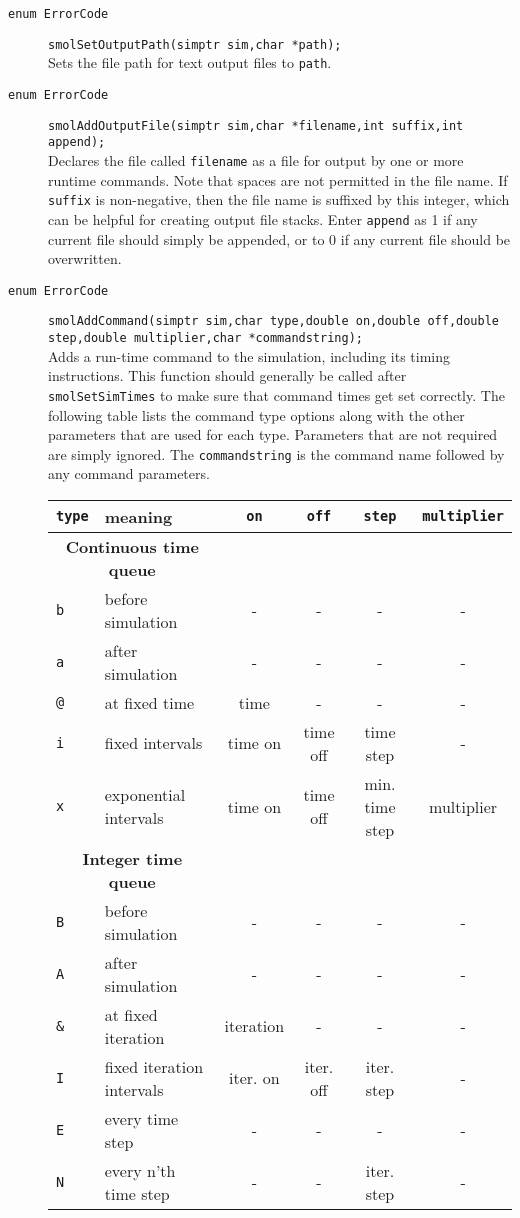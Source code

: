 \documentclass {book}
\begin{document}
\begin{description}

\item[\texttt{enum ErrorCode}]
\texttt{smolSetOutputPath(simptr sim,char *path);}
\hfill \\
Sets the file path for text output files to \texttt{path}.

\item[\texttt{enum ErrorCode}]
\texttt{smolAddOutputFile(simptr sim,char *filename,int suffix,int append);}
\hfill \\
Declares the file called \texttt{filename} as a file for output by one or more runtime commands.  Note that spaces are not permitted in the file name.  If \texttt{suffix} is non-negative, then the file name is suffixed by this integer, which can be helpful for creating output file stacks.  Enter \texttt{append} as 1 if any current file should simply be appended, or to 0 if any current file should be overwritten.

\item[\texttt{enum ErrorCode}]
\texttt{smolAddCommand(simptr sim,char type,double on,double off,double step,double multiplier,char *commandstring);}
\hfill \\
Adds a run-time command to the simulation, including its timing instructions.  This function should generally be called after \texttt{smolSetSimTimes} to make sure that command times get set correctly.  The following table lists the command type options along with the other parameters that are used for each type.  Parameters that are not required are simply ignored.  The \texttt{commandstring} is the command name followed by any command parameters.

\begin{longtable}[c]{ll|cccc}
\texttt{type} & meaning & \texttt{on} & \texttt{off} & \texttt{step} & \texttt{multiplier}\\
\hline
\multicolumn{2}{c}{\textbf{Continuous time queue}}\\
\texttt{b} & before simulation & - & - & - & -\\
\texttt{a} & after simulation & - & - & - & -\\
\texttt{@} & at fixed time & time & - & - & -\\
\texttt{i} & fixed intervals & time on & time off & time step & -\\
\texttt{x} & exponential intervals & time on & time off & min. time step & multiplier\\
\hline
\multicolumn{2}{c}{\textbf{Integer time queue}}\\
\texttt{B} & before simulation & - & - & - & -\\
\texttt{A} & after simulation & - & - & - & -\\
\texttt{\&} & at fixed iteration & iteration & - & - & -\\
\texttt{I} & fixed iteration intervals & iter. on & iter. off & iter. step & -\\
\texttt{E} & every time step & - & - & - & -\\
\texttt{N} & every n'th time step & - & - & iter. step & -\\
\end{longtable}


\end{description}
\end{document}
